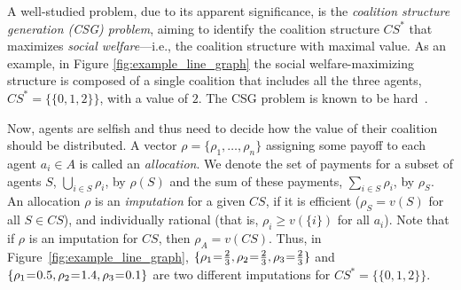 \documentclass{aamas2012}
\begin{document}

A well-studied problem, due to its apparent significance, is  the {\em coalition structure
generation (CSG) problem}, aiming to identify the
coalition structure $CS^*$ that maximizes {\em social welfare}---i.e., the coalition
structure with maximal value. As an example, in Figure \ref{fig:example_line_graph} the social welfare-maximizing structure
 is composed of a single coalition that includes all the three agents,
$CS^*=\{\{0,1,2\}\}$, with a value of $2$.
The CSG problem is known to be hard~\cite{DBLP:journals/ai/SandholmLAST99}.



Now, agents are selfish and thus need to decide how the value 
of their coalition should be distributed.
A vector $\rho = \{\rho_1, \ldots, \rho_n\}$ assigning
some payoff to each agent $a_i \in A$ is called an \emph{allocation}.
We denote the set of payments for a
subset of agents $S$, $\bigcup_{i\in S} \rho_i$, by $\rho(S)$ and the sum of
these payments, $\sum_{i\in S} \rho_i$, by $\rho_S$. An allocation $\rho$ is an
{\em imputation} for a given $CS$, if it is efficient ($\rho_S =v(S)$ for all $S \in CS$), and individually rational (that is, $\rho_i \geq v(\{i\})$ for all $a_i$). Note that if $\rho$ is an imputation for $CS$, then $\rho_A = v(CS)$. Thus, in Figure~\ref{fig:example_line_graph},
$\{\rho_1\hspace{-0.03in}=\hspace{-0.03in}\frac{2}{3},
\rho_2\hspace{-0.03in}=\hspace{-0.03in}\frac{2}{3}, \rho_3\hspace{-0.03in}
=\hspace{-0.03in}\frac{2}{3}\}$ and
$\{\rho_1\hspace{-0.03in}=\hspace{-0.03in}0.5,
\rho_2\hspace{-0.03in}=\hspace{-0.03in}1.4, \rho_3\hspace{-0.03in}
=\hspace{-0.03in}0.1\}$ are two different imputations for $CS^*=\{\{0,1,2\}\}$.
 
\end{document}

